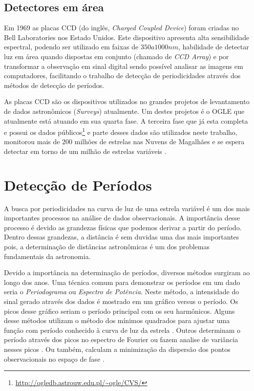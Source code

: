 \subsection{Detectores em área}

Em 1969 as placas CCD (do inglês, \textit{Charged Coupled Device}) foram criadas no Bell Laboratories nos Estado Unidos. Este dispositivo apresenta alta sensibilidade espectral, podendo ser utilizado em faixas de $350 a 1000 \si{nm}$, habilidade de detectar luz em área quando dispostas em conjunto (chamado de \textit{CCD Array}) e por transformar a observação em sinal digital sendo possível analisar as imagens em computadores, facilitando o trabalho de detecção de periodicidades através dos métodos de detecção de períodos.

As placas CCD são os dispositivos utilizados no grandes projetos de levantamento de dados astronômicos (\textit{Surveys}) atualmente. Um destes projetos é o OGLE que atualmente está atuando em sua quarta fase. A terceira fase \citep{Udalski2008} que já esta completa e possui os dados públicos\footnote{\url{http://ogledb.astrouw.edu.pl/~ogle/CVS/}} e parte desses dados são utilizados neste trabalho, monitorou mais de 200 milhões de estrelas nas Nuvens de Magalhães e se espera detectar em torno de um milhão de estrelas variáveis .


\section{Detecção de Períodos}

A busca por periodicidades na curva de luz de uma estrela variável é um dos mais importantes processos na análise de dados observacionais. A importância desse processo é devido as grandezas físicas que podemos derivar a partir do período. Dentro dessas grandezas, a distância é sem duvidas uma das mais importantes pois, a determinação de distâncias astronômicas é um dos problemas fundamentais da astronomia.

Devido a importância na determinação de períodos, diversos métodos surgiram ao longo dos anos. Uma técnica comum para demonstrar os períodos em um dado seria o \textit{Periodograma} ou \textit{Espectro de Potência}. Neste método, a intensidade do sinal gerado através dos dados é mostrado em um gráfico versus o período. Os picos desse gráfico seriam o período principal com os seu harmônicos. Alguns desse métodos utilizam o método dos mínimos quadrados para ajustar uma função com período conhecido à curva de luz da estrela \citep{lomb}. Outros determinam o período através dos picos no espectro de Fourier \citep{mello81} ou fazem analise de variância nesses picos \citep{aov}. Ou também, calculam a minimização da dispersão dos pontos observacionais no espaço de fase \citep{Cincotta1999, entropy, ce}.


